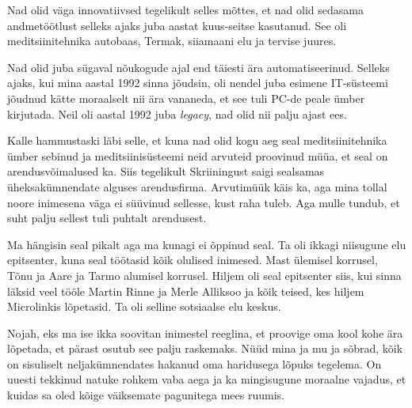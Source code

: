 Nad olid väga innovatiivsed tegelikult selles mõttes, et nad olid 
sedasama andmetöötlust selleks ajaks juba aastat kuus-seitse kasutanud. See oli 
 meditsiinitehnika autobaas, Termak, siiamaani elu ja tervise 
juures. 



Nad olid juba sügaval nõukogude ajal end täiesti ära automatiseerinud. Selleks 
ajaks, kui mina aastal 1992 sinna jõudsin, oli nendel juba esimene IT-süsteemi 
jõudnud kätte moraalselt nii ära vananeda, et see tuli PC-de peale ümber 
kirjutada. Neil oli aastal 1992 juba \emph{legacy}, nad olid nii palju ajast 
ees.


Kalle hammustaski läbi selle, et kuna nad olid kogu 
aeg seal meditsiinitehnika ümber sebinud ja meditsiinisüsteemi neid arvuteid 
proovinud müüa, et seal on arendusvõimalused 
ka. Siis tegelikult Skriiningust saigi sealsamas 
üheksakümnendate alguses  arendusfirma. Arvutimüük käis ka, aga mina  
tollal noore inimesena väga ei süüvinud sellesse, kust raha tuleb. Aga mulle 
tundub, et suht palju sellest tuli puhtalt arendusest.



Ma hängisin seal pikalt aga ma kunagi ei õppinud seal. Ta oli ikkagi niisugune 
elu epitsenter, kuna seal töötasid kõik olulised inimesed. 
Mast ülemisel korrusel, Tõnu ja 
Aare ja Tarmo alumisel 
korrusel. Hiljem oli seal epitsenter siis, kui sinna läksid veel tööle 
Martin Rinne ja Merle Alliksoo ja kõik teised, kes hiljem Microlinkis lõpetasid. Ta 
oli selline  sotsiaalse elu keskus. 


Nojah, eks ma ise ikka soovitan inimestel reeglina, et  proovige oma kool kohe 
ära lõpetada, et pärast osutub see palju raskemaks. Nüüd mina ja mu ja sõbrad, 
kõik on sisuliselt neljakümnendates hakanud oma haridusega lõpuks tegelema. On 
uuesti tekkinud natuke rohkem vaba aega ja ka mingisugune moraalne vajadus, et 
kuidas sa oled kõige väiksemate pagunitega mees ruumis.

